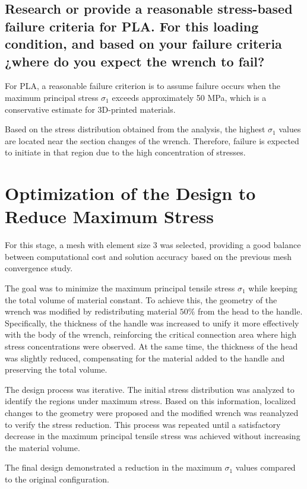 \documentclass[12pt]{article}
\begin{document}
\subsection{Research or provide a reasonable stress-based failure criteria for PLA. For this loading condition, and based on your failure criteria ¿where do you expect the wrench to fail?}

For PLA, a reasonable failure criterion is to assume failure occurs when the maximum principal stress $\sigma_1$ exceeds approximately 50 MPa, which is a conservative estimate for 3D-printed materials.

Based on the stress distribution obtained from the analysis, the highest $\sigma_1$ values are located near the section changes of the wrench.  
Therefore, failure is expected to initiate in that region due to the high concentration of stresses.


\section{Optimization of the Design to Reduce Maximum Stress}

For this stage, a mesh with element size $3$ was selected, providing a good balance between computational cost and solution accuracy based on the previous mesh convergence study.

The goal was to minimize the maximum principal tensile stress $\sigma_1$ while keeping the total volume of material constant.  
To achieve this, the geometry of the wrench was modified by redistributing material $50\%$ from the head to the handle.  
Specifically, the thickness of the handle was increased to unify it more effectively with the body of the wrench, reinforcing the critical connection area where high stress concentrations were observed.  
At the same time, the thickness of the head was slightly reduced, compensating for the material added to the handle and preserving the total volume.

The design process was iterative. The initial stress distribution was analyzed to identify the regions under maximum stress. Based on this information, localized changes to the geometry were proposed and the modified wrench was reanalyzed to verify the stress reduction.  
This process was repeated until a satisfactory decrease in the maximum principal tensile stress was achieved without increasing the material volume.

The final design demonstrated a reduction in the maximum $\sigma_1$ values compared to the original configuration. 
\end{document}
